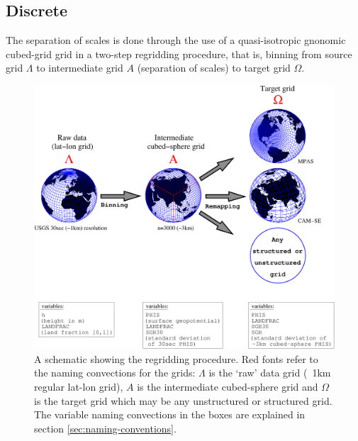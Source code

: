 \documentclass[gmd]{copernicus}
\begin{document}
{\color{red}{[julio: continuous definition of dominant orientation of topography with this notation?]}}
\subsection{Discrete}\label{sec:discrete}
The separation of scales is done through the use of a quasi-isotropic gnonomic cubed-grid grid in a two-step regridding procedure, that is, binning from source grid $\Lambda$ to intermediate grid $A$ (separation of scales) to target grid $\Omega$. 

\begin{figure}[t]
\vspace*{2mm}
\begin{center}
\includegraphics[width=12cm]{fig/schematic}
\end{center}
  \caption{A schematic showing the regridding procedure. Red fonts refer to the naming convections for the grids: $\Lambda$ is the `raw' data grid (~1km regular lat-lon grid), $A$ is the intermediate cubed-sphere grid and $\Omega$ is the target grid which may be any unstructured or structured grid. The variable naming convections in the boxes are explained in section \ref{sec:naming-conventions}.}\label{fig:schematic}
\end{figure}
\end{document}
